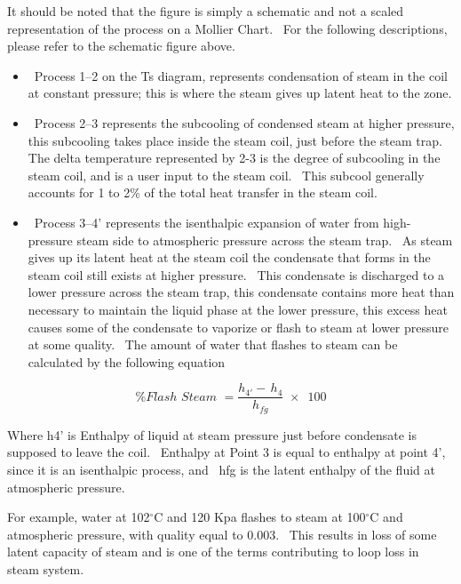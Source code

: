 It should be noted that the figure is simply a schematic and not a scaled representation of the process on a Mollier Chart.~ For the following descriptions, please refer to the schematic figure above.

\begin{itemize}
\item
  ~Process 1--2 on the Ts diagram, represents condensation of steam in the coil at constant pressure; this is where the steam gives up latent heat to the zone.
\item
  ~Process 2--3 represents the subcooling of condensed steam at higher pressure, this subcooling takes place inside the steam coil, just before the steam trap.~ The delta temperature represented by 2-3 is the degree of subcooling in the steam coil, and is a user input to the steam coil.~ This subcool generally accounts for 1 to 2\% of the total heat transfer in the steam coil.
\item
  ~Process 3--4' represents the isenthalpic expansion of water from high-pressure steam side to atmospheric pressure across the steam trap.~ As steam gives up its latent heat at the steam coil the condensate that forms in the steam coil still exists at higher pressure.~ This condensate is discharged to a lower pressure across the steam trap, this condensate contains more heat than necessary to maintain the liquid phase at the lower pressure, this excess heat causes some of the condensate to vaporize or flash to steam at lower pressure at some quality.~ The amount of water that flashes to steam can be calculated by the following equation
\end{itemize}

\begin{equation}
\% Flash\,\,Steam\,\, = \frac{{{h_{4'}} - \,{h_4}}}{{{h_{fg}}}}\,\, \times \,\,\,100
\end{equation}

Where h4' is Enthalpy of liquid at steam pressure just before condensate is supposed to leave the coil.~ Enthalpy at Point 3 is equal to enthalpy at point 4', since it is an isenthalpic process, and~ hfg is the latent enthalpy of the fluid at atmospheric pressure.

For example, water at 102\(^{\circ}\)C and 120 Kpa flashes to steam at 100\(^{\circ}\)C and atmospheric pressure, with quality equal to 0.003.~ This results in loss of some latent capacity of steam and is one of the terms contributing to loop loss in steam system.

